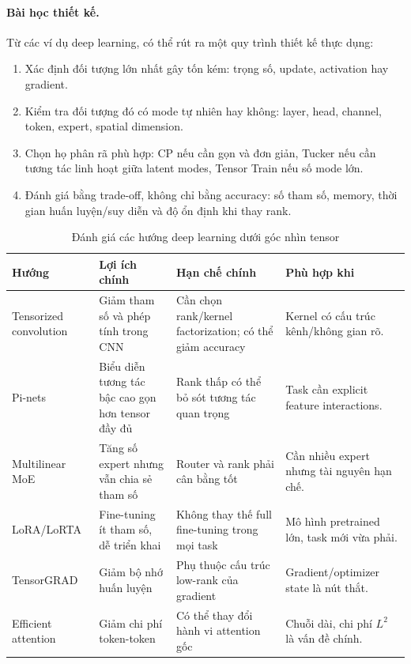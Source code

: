\paragraph{Bài học thiết kế.}
Từ các ví dụ deep learning, có thể rút ra một quy trình thiết kế thực dụng:
\begin{enumerate}[label=\textbf{\arabic*.}, leftmargin=2em]
    \item Xác định đối tượng lớn nhất gây tốn kém: trọng số, update, activation hay
    gradient.
    \item Kiểm tra đối tượng đó có mode tự nhiên hay không: layer, head, channel,
    token, expert, spatial dimension.
    \item Chọn họ phân rã phù hợp: CP nếu cần gọn và đơn giản, Tucker nếu cần tương
    tác linh hoạt giữa latent modes, Tensor Train nếu số mode lớn.
    \item Đánh giá bằng trade-off, không chỉ bằng accuracy: số tham số, memory,
    thời gian huấn luyện/suy diễn và độ ổn định khi thay rank.
\end{enumerate}

\begin{table}[H]
\centering
\small
\caption{Đánh giá các hướng deep learning dưới góc nhìn tensor}
\label{tab:dl-method-evaluation}
\begin{tabular}{L{0.2\textwidth}L{0.25\textwidth}L{0.25\textwidth}L{0.2\textwidth}}
\toprule
\textbf{Hướng} & \textbf{Lợi ích chính} & \textbf{Hạn chế chính} & \textbf{Phù hợp khi} \\
\midrule
Tensorized convolution &
Giảm tham số và phép tính trong CNN &
Cần chọn rank/kernel factorization; có thể giảm accuracy &
Kernel có cấu trúc kênh/không gian rõ. \\
\addlinespace
Pi-nets &
Biểu diễn tương tác bậc cao gọn hơn tensor đầy đủ &
Rank thấp có thể bỏ sót tương tác quan trọng &
Task cần explicit feature interactions. \\
\addlinespace
Multilinear MoE &
Tăng số expert nhưng vẫn chia sẻ tham số &
Router và rank phải cân bằng tốt &
Cần nhiều expert nhưng tài nguyên hạn chế. \\
\addlinespace
LoRA/LoRTA &
Fine-tuning ít tham số, dễ triển khai &
Không thay thế full fine-tuning trong mọi task &
Mô hình pretrained lớn, task mới vừa phải. \\
\addlinespace
TensorGRAD &
Giảm bộ nhớ huấn luyện &
Phụ thuộc cấu trúc low-rank của gradient &
Gradient/optimizer state là nút thắt. \\
\addlinespace
Efficient attention &
Giảm chi phí token-token &
Có thể thay đổi hành vi attention gốc &
Chuỗi dài, chi phí $L^2$ là vấn đề chính. \\
\bottomrule
\end{tabular}
\end{table}

